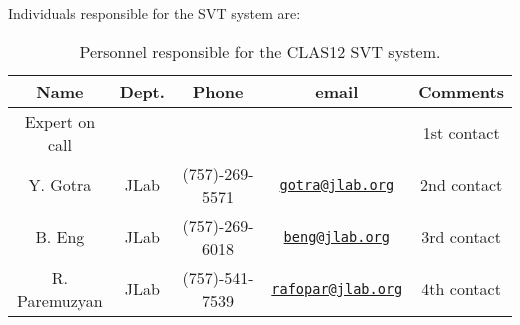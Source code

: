 Individuals responsible for the SVT system are:

\begin{table}[htbp]
\centering
\begin{tabular}{|c|c|c|c|c|} \hline
Name&Dept.&Phone&email&Comments \\ \hline
Expert on call& &&& 1st contact \\ \hline
Y. Gotra& JLab&(757)-269-5571&\href{mailto:gotra@jlab.org}{\nolinkurl{gotra@jlab.org}}&2nd contact \\ \hline
B. Eng&JLab&(757)-269-6018&\href{mailto:beng@jlab.org}{\nolinkurl{beng@jlab.org}}&3rd contact \\ \hline
R. Paremuzyan&JLab&(757)-541-7539&\href{mailto:rafopar@jlab.org}{\nolinkurl{rafopar@jlab.org}}&4th contact \\ \hline
\end{tabular}
\caption{Personnel responsible for the CLAS12 SVT system.} 
\label{tb:svt}
\end{table}

